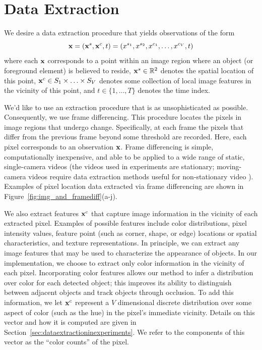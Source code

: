 \documentclass[twocolumn, final]{svjour3}
\begin{document}

\section{Data Extraction}
\label{sec:dataextraction}

We desire a data extraction procedure that yields observations of the form
\begin{equation}
\centering
\bold{x} = ( \bold{x}^{s}, \bold{x}^{c}, t ) = ( x^{s_{1}}, x^{s_{2}}, x^{c_{1}}, \ldots, x^{c_{V}}, t )
\end{equation}
where each $\bold{x}$ corresponds to a point within an image region where an object (or foreground element)  is believed to reside, $\bold{x}^{s} \in \mathbb{R}^{2}$ denotes the spatial location of this point, $\bold{x}^{c} \in S_{1} \times \ldots \times S_{V}$ denotes some collection of local image features in the vicinity of this point, and $t \in \{1, \ldots, T \}$ denotes the time index.

We'd like to use an extraction procedure that is as unsophisticated as possible. Consequently, we use frame differencing. This procedure locates the pixels in image regions that undergo change. Specifically, at each frame the pixels that differ from the previous frame beyond some threshold are recorded. Here, each pixel corresponds to an observation $\bold{x}$. Frame differencing is simple, computationally inexpensive, and able to be applied to a wide range of static, single-camera videos (the videos used in experiments are stationary; moving-camera videos require data extraction methods useful for non-stationary video \cite{chien2002efficient, zhang2007moving}). Examples of pixel location data extracted via frame differencing are shown in Figure~\ref{fig:img_and_framediff}(a-j).

We also extract features $\bold{x}^{c}$ that capture image information in the vicinity of each extracted pixel. Examples of possible features include color distributions, pixel intensity values, feature point (such as corner, shape, or edge) locations or spatial characteristics, and texture representations. In principle, we can extract any image features that may be used to characterize the appearance of objects. In our implementation, we choose to extract only color information in the vicinity of each pixel. Incorporating color features allows our method to infer a distribution over color for each detected object; this improves its ability to distinguish between adjacent objects and track objects through occlusion. To add this information, we let $\bold{x}^{c}$ represent a $V$ dimensional discrete distribution over some aspect of color (such as the hue) in the pixel's immediate vicinity. Details on this vector and how it is computed are given in Section~\ref{sec:dataextractioninexperiments}. We refer to the components of this vector as the ``color counts'' of the pixel.
\end{document}
